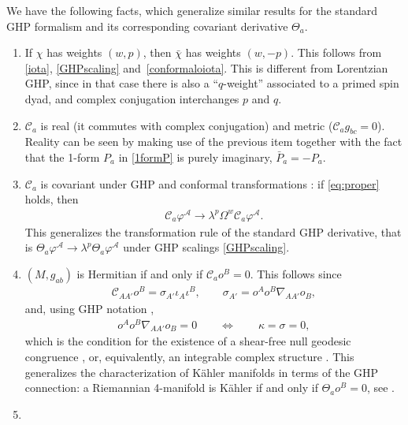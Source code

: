 \documentclass[pdftex]{sigma}
\numberwithin{equation}{section}
\begin{document}
\begin{Remark}%
We have the following facts, which generalize similar results for the standard GHP formalism and its corresponding covariant derivative $\Theta_{a}$.
\begin{enumerate}\itemsep=0pt
\item
If $\chi$ has weights $(w,p)$, then $\bar\chi$ has weights $(w,-p)$. This follows from \eqref{iota}, \eqref{GHPscaling} and~\eqref{conformaloiota}.
This is different from Lorentzian GHP, since in that case there is also a ``$q$-weight'' associated to a primed spin dyad, and complex conjugation interchanges $p$ and $q$.
\item
$\mathcal{C}_{a}$ is real (it commutes with complex conjugation) and metric ($\mathcal{C}_{a}g_{bc}=0$).
Reality can be seen by making use of the previous item together with the fact that the 1-form $P_{a}$ in \eqref{1formP} is purely imaginary, $\bar{P}_{a}=-P_{a}$.
\item
$\mathcal{C}_{a}$ is covariant under GHP and conformal transformations \cite[Section 2.3]{araneda2021conformal}: if \eqref{eq:proper} holds, then
\begin{align*}
 \mathcal{C}_{a}\varphi^{\mathcal{A}} \to \lambda^p \Omega^w \mathcal{C}_{a}\varphi^{\mathcal{A}}.
\end{align*}
This generalizes the transformation rule of the standard GHP derivative, that is $\Theta_{a}\varphi^{\mathcal{A}} \to \lambda^p\Theta_{a}\varphi^{\mathcal{A}}$ under GHP scalings \eqref{GHPscaling}.
\item
$(M,g_{ab})$ is Hermitian if and only if $\mathcal{C}_{a}o^{B}=0$. This follows since
\begin{align*}
\mathcal{C}_{AA'}o^{B} = \sigma_{A'}\iota_{A}\iota^{B}, \qquad
\sigma_{A'}=o^{A}o^{B}\nabla_{AA'}o_{B},
\end{align*}
and, using GHP notation \cite{PR:I},
\begin{align}\label{SFR}
o^{A}o^{B}\nabla_{AA'}o_{B} = 0 \qquad \Leftrightarrow \qquad \kappa=\sigma=0,
\end{align}
which is the condition for the existence of a shear-free null geodesic congruence \cite[equation~(7.3.1)]{PR:II}, or, equivalently, an integrable complex structure \cite[Section 2.4]{araneda2021conformal}.
This generalizes the characterization of K\"ahler manifolds in terms of the GHP connection: a Riemannian 4-manifold is K\"ahler if and only if $\Theta_{a}o^{B}=0$, see \cite[Chapter~IV, Proposition~9.8]{lawson:michelsohn}.
\item

\end{enumerate}
\end{Remark}
\end{document}
